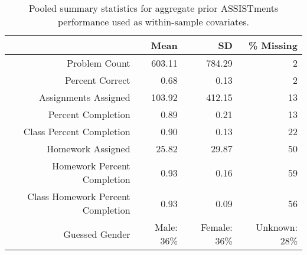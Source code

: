 \begin{table}[ht]
\centering
\begin{tabular}{rrrr}
  \hline
 & Mean & SD & \% Missing \\ 
  \hline
Problem Count & 603.11 & 784.29 & 2 \\ 
  Percent Correct & 0.68 & 0.13 & 2 \\ 
  Assignments Assigned & 103.92 & 412.15 & 13 \\ 
  Percent Completion & 0.89 & 0.21 & 13 \\ 
  Class Percent Completion & 0.90 & 0.13 & 22 \\ 
  Homework Assigned & 25.82 & 29.87 & 50 \\ 
  Homework Percent Completion & 0.93 & 0.16 & 59 \\ 
  Class Homework Percent Completion & 0.93 & 0.09 & 56 \\ 
   Guessed Gender&Male: 36\%&Female: 36\%&Unknown: 28\%\\
 \hline
\end{tabular}
\caption{Pooled summary statistics for aggregate prior ASSISTments performance used as within-sample covariates.} 
\label{tab:covariates}
\end{table}
